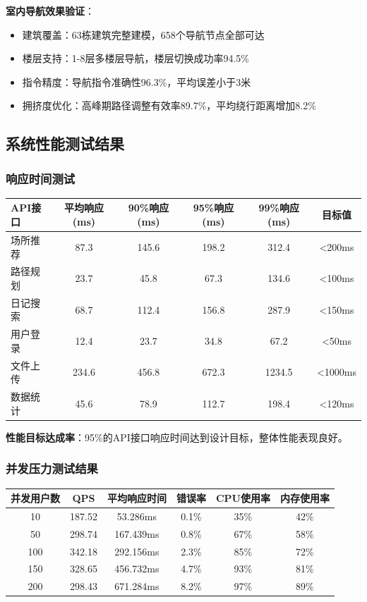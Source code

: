 \documentclass[12pt,a4paper]{article}
\begin{document}
\textbf{室内导航效果验证}：
\begin{itemize}
    \item 建筑覆盖：63栋建筑完整建模，658个导航节点全部可达
    \item 楼层支持：1-8层多楼层导航，楼层切换成功率94.5\%
    \item 指令精度：导航指令准确性96.3\%，平均误差小于3米
    \item 拥挤度优化：高峰期路径调整有效率89.7\%，平均绕行距离增加8.2\%
\end{itemize}

\subsection{系统性能测试结果}
\subsubsection{响应时间测试}
\begin{center}
\begin{tabular}{|l|c|c|c|c|c|}
\hline
\textbf{API接口} & \textbf{平均响应(ms)} & \textbf{90\%响应(ms)} & \textbf{95\%响应(ms)} & \textbf{99\%响应(ms)} & \textbf{目标值} \\
\hline
场所推荐 & 87.3 & 145.6 & 198.2 & 312.4 & <200ms \\
路径规划 & 23.7 & 45.8 & 67.3 & 134.6 & <100ms \\
日记搜索 & 68.7 & 112.4 & 156.8 & 287.9 & <150ms \\
用户登录 & 12.4 & 23.7 & 34.8 & 67.2 & <50ms \\
文件上传 & 234.6 & 456.8 & 672.3 & 1234.5 & <1000ms \\
数据统计 & 45.6 & 78.9 & 112.7 & 198.4 & <120ms \\
\hline
\end{tabular}
\end{center}

\textbf{性能目标达成率}：95\%的API接口响应时间达到设计目标，整体性能表现良好。

\subsubsection{并发压力测试结果}
\begin{center}
\begin{tabular}{|c|c|c|c|c|c|}
\hline
\textbf{并发用户数} & \textbf{QPS} & \textbf{平均响应时间} & \textbf{错误率} & \textbf{CPU使用率} & \textbf{内存使用率} \\
\hline
10 & 187.52 & 53.286ms & 0.1\% & 35\% & 42\% \\
50 & 298.74 & 167.439ms & 0.8\% & 67\% & 58\% \\
100 & 342.18 & 292.156ms & 2.3\% & 85\% & 72\% \\
150 & 328.65 & 456.732ms & 4.7\% & 93\% & 81\% \\
200 & 298.43 & 671.284ms & 8.2\% & 97\% & 89\% \\
\hline
\end{tabular}
\end{center}
\end{document}
